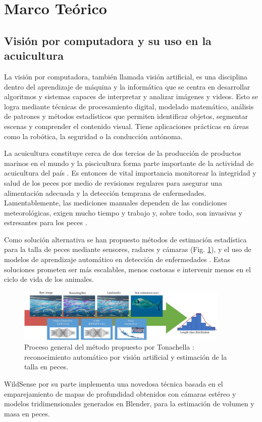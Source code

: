 \section{Marco Teórico}
\subsection{Visión por computadora y su uso en la acuicultura}
La visión por computadora, también llamada visión artificial, es una disciplina dentro del aprendizaje de máquina y la informática que se centra en desarrollar algoritmos y sistemas capaces de interpretar y analizar imágenes y videos. Esto se logra mediante técnicas de procesamiento digital, modelado matemático, análisis de patrones y métodos estadísticos que permiten identificar objetos, segmentar escenas y comprender el contenido visual. Tiene aplicaciones prácticas en áreas como la robótica, la seguridad o la conducción autónoma.

La acuicultura constituye cerca de dos tercios de la producción de productos marinos en el mundo \cite{FAO2018} y la piscicultura forma parte importante de la actividad de acuicultura del país \cite{chile2017levantamiento}. Es entonces de vital importancia monitorear la integridad y salud de los peces por medio de revisiones regulares para asegurar una alimentación adecuada y la detección temprana de enfermedades. Lamentablemente, las mediciones manuales dependen de las condiciones meteorológicas, exigen mucho tiempo y trabajo y, sobre todo, son invasivas y estresantes para los peces \cite{Tonachella2022}.

Como solución alternativa se han propuesto métodos de estimación estadística para la talla de peces mediante sensores, radares y cámaras \cite{Tonachella2022} (Fig. \ref{fig:workflow_tonachella}), y el uso de modelos de aprendizaje automático en detección de enfermedades \cite{Ahmed2022}. Estas soluciones prometen ser más escalables, menos costosas e intervenir menos en el ciclo de vida de los animales.

\begin{figure}[htbp]
\begin{center}
    \includegraphics[width=0.9\textwidth]{figures/workflow_tonachella.png}
    \caption[Flujo de trabajo propuesto por Tonachella para estimación de la talla en peces]{Proceso general del método propuesto por Tonachella \cite{Tonachella2022}: reconocimiento automático por visión artificial y estimación de la talla en peces.}
    \label{fig:workflow_tonachella}
\end{center}
\end{figure}

WildSense por su parte implementa una novedosa técnica basada en el emparejamiento de mapas de profundidad obtenidos con cámaras estéreo y modelos tridimensionales generados en Blender, para la estimación de volumen y masa en peces.